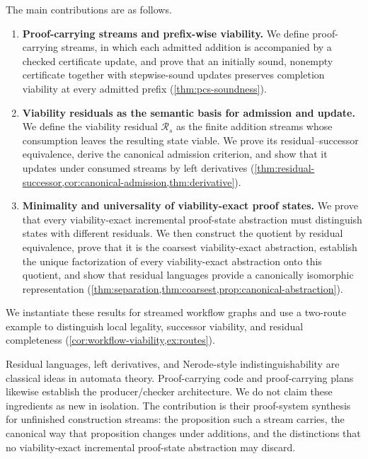 \documentclass[11pt]{article}
\theoremstyle{definition}
\newcommand{\Residual}{\mathcal R}
\begin{document}

The main contributions are as follows.

\begin{enumerate}[label=(\roman*)]

  \item \textbf{Proof-carrying streams and prefix-wise viability.}
  We define proof-carrying streams, in which each admitted addition is
  accompanied by a checked certificate update, and prove that an initially
  sound, nonempty certificate together with stepwise-sound updates preserves
  completion viability at every admitted prefix
  (\cref{thm:pcs-soundness}).

  \item \textbf{Viability residuals as the semantic basis for admission and update.}
  We define the viability residual $\Residual_s$ as the finite addition streams
  whose consumption leaves the resulting state viable. We prove its
  residual--successor equivalence, derive the canonical admission criterion,
  and show that it updates under consumed streams by left derivatives
  (\cref{thm:residual-successor,cor:canonical-admission,thm:derivative}).

  \item \textbf{Minimality and universality of viability-exact proof states.}
  We prove that every viability-exact incremental proof-state abstraction must
  distinguish states with different residuals. We then construct the quotient
  by residual equivalence, prove that it is the coarsest viability-exact
  abstraction, establish the unique factorization of every viability-exact
  abstraction onto this quotient, and show that residual languages provide a
  canonically isomorphic representation
  (\cref{thm:separation,thm:coarsest,prop:canonical-abstraction}).

\end{enumerate}

We instantiate these results for streamed workflow graphs and use a
two-route example to distinguish local legality, successor viability, and
residual completeness (\cref{cor:workflow-viability,ex:routes}).

Residual languages, left derivatives, and Nerode-style indistinguishability are classical ideas in automata theory. Proof-carrying code and proof-carrying plans likewise establish the producer/checker architecture. We do not claim these ingredients as new in isolation. The contribution is their proof-system synthesis for unfinished construction streams: the proposition such a stream carries, the canonical way that proposition changes under additions, and the distinctions that no viability-exact incremental proof-state abstraction may discard.
\end{document}
